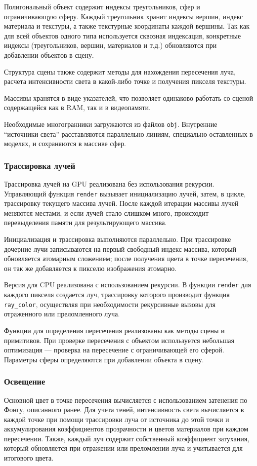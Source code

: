 Полигональный объект содержит индексы треугольников, сфер и ограничивающую сферу. Каждый треугольник хранит индексы вершин, индекс материала и текстуры, а также текстурные координаты каждой вершины. Так как для всей объектов одного типа используется сквозная индексация, конкретные индексы (треугольников, вершин, материалов и т.д.) обновляются при добавлении объектов в сцену.

Структура сцены также содержит методы для нахождения пересечения луча, расчета интенсивности света в какой-либо точке и получения пикселя текстуры.

Массивы хранятся в виде указателей, что позволяет одинаково работать со сценой содержащейся как в RAM, так и в видеопамяти.

Необходимые многогранники загружаются из файлов \texttt{obj}. Внутренние \enquote{источники света} расставляются параллельно линиям, специально оставленных в моделях, и сохраняются в массиве сфер.

\subsubsection*{Трассировка лучей}
Трассировка лучей на GPU реализована без использования рекурсии. Управляющий функция \texttt{render} вызывает инициализацию лучей, затем, в цикле, трассировку текущего массива лучей. После каждой итерации массивы лучей меняются местами, и если лучей стало слишком много, происходит перевыделения памяти для результирующего массива.

Инициализация и трассировка выполняются параллельно. При трассировке дочерние лучи записываются на первый свободный индекс массива, который обновляется атомарным сложением; после получения цвета в точке пересечения, он так же добавляется к пикселю изображения атомарно.

Версия для CPU реализована с использованием рекурсии. В функции \texttt{render} для каждого пикселя создается луч, трассировку которого производит функция \texttt{ray\_color}, осуществляя при необходимости рекурсивные вызовы для отраженного или преломленного луча.

Функции для определения пересечения реализованы как методы сцены и примитивов. При проверке пересечения с объектом используется небольшая оптимизация --- проверка на пересечение с ограничивающей его сферой. Параметры сферы определяются при добавлении объекта в сцену.

\subsubsection*{Освещение}
Основной цвет в точке пересечения вычисляется с использованием затенения по Фонгу, описанного ранее. Для учета теней, интенсивность света вычисляется в каждой точке при помощи трассировки луча от источника до этой точки и аккумулирования коэффициентов прозрачности и цветов материалов при каждом пересечении. Также, каждый луч содержит собственный коэффициент затухания, который обновляется при отражении или преломлении луча и учитывается для итогового цвета.

